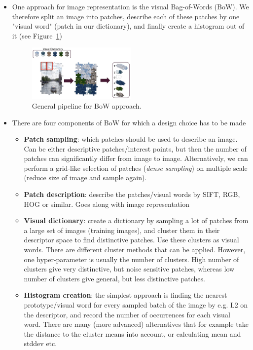 \begin{itemize}
	\item One approach for image representation is the visual Bag-of-Words (BoW). We therefore split an image into patches, describe each of these patches by one "visual word" (patch in our dictionary), and finally create a histogram out of it (see Figure~\ref{fig:BoW_pipeline})
	\begin{figure}[ht!]
		\centering
		\includegraphics[width=0.5\textwidth]{figures/cv_object_detection_BoW_pipeline.png}
		\caption{General pipeline for BoW approach.}
		\label{fig:BoW_pipeline}
	\end{figure}
	\item There are four components of BoW for which a design choice has to be made
	\begin{itemize}
		\item \textbf{Patch sampling}: which patches should be used to describe an image. Can be either descriptive patches/interest points, but then the number of patches can significantly differ from image to image. Alternatively, we can perform a grid-like selection of patches (\textit{dense sampling}) on multiple scale (reduce size of image and sample again).
		\item \textbf{Patch description}: describe the patches/visual words by SIFT, RGB, HOG or similar. Goes along with image representation 
		\item \textbf{Visual dictionary}: create a dictionary by sampling a lot of patches from a large set of images (training images), and cluster them in their descriptor space to find distinctive patches. Use these clusters as visual words. There are different cluster methods that can be applied. However, one hyper-parameter is usually the number of clusters. High number of clusters give very distinctive, but noise sensitive patches, whereas low number of clusters give general, but less distinctive patches.
		\item \textbf{Histogram creation}: the simplest approach is finding the nearest prototype/visual word for every sampled batch of the image by e.g. L2 on the descriptor, and record the number of occurrences for each visual word. There are many (more advanced) alternatives that for example take the distance to the cluster means into account, or calculating mean and stddev etc. 

\end{itemize}
\end{itemize}
